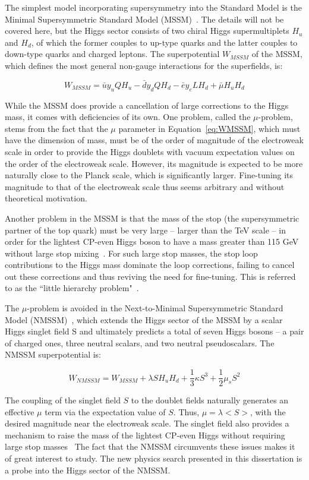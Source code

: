 The simplest model incorporating supersymmetry into the Standard Model is the Minimal Supersymmetric Standard Model (MSSM)~\cite{Martin:1997ns}. The details will not be covered here, but the Higgs sector consists of two chiral Higgs supermultiplets $H_u$ and $H_d$, of which the former couples to up-type quarks and the latter couples to down-type quarks and charged leptons. The superpotential $W_{MSSM}$ of the MSSM, which defines the most general non-gauge interactions for the superfields, is:

\begin{equation}
W_{MSSM} = \bar{u}y_{u}QH_{u} - \bar{d}y_{d}QH_{d} - \bar{e}y_{e}LH_{d} + \bar{\mu}H_{u}H_{d}
\label{eq:WMSSM}
\end{equation}

While the MSSM does provide a cancellation of large corrections to the Higgs mass, it comes with deficiencies of its own. One problem, called the $\mu$-problem, stems from the fact that the $\mu$ parameter in Equation~\ref{eq:WMSSM}, which must have the dimension of mass, must be of the order of magnitude of the electroweak scale in order to provide the Higgs doublets with vacuum expectation values on the order of the electroweak scale. However, its magnitude is expected to be more naturally close to the Planck scale, which is significantly larger. Fine-tuning its magnitude to that of the electroweak scale thus seems arbitrary and without theoretical motivation.

Another problem in the MSSM is that the mass of the stop (the supersymmetric partner of the top quark) must be very large -- larger than the TeV scale -- in order for the lightest CP-even Higgs boson to have a mass greater than 115 GeV without large stop mixing~\cite{Chatrchyan:2012am}. For such large stop masses, the stop loop contributions to the Higgs mass dominate the loop corrections, failing to cancel out these corrections and thus reviving the need for fine-tuning. This is referred to as the ``little hierarchy problem"~\cite{Bellazzini:2009ix}.

The $\mu$-problem is avoided in the Next-to-Minimal Supersymmetric Standard Model (NMSSM)~\cite{Maniatis:2009re}, which extends the Higgs sector of the MSSM by a scalar Higgs singlet field S and ultimately predicts a total of seven Higgs bosons -- a pair of charged ones, three neutral scalars, and two neutral pseudoscalars. The NMSSM superpotential is:

\begin{equation}
W_{NMSSM} = W_{MSSM} + \lambda SH_{u}H_{d} + \frac{1}{3}\kappa S^3 + \frac{1}{2}\mu_{s}S^2
\label{eq:WNMSSM}
\end{equation}

The coupling of the singlet field $S$ to the doublet fields naturally generates an effective $\mu$ term via the expectation value of $S$. Thus, $\mu = \lambda$$<S>$, with the desired magnitude near the electroweak scale. The singlet field also provides a mechanism to raise the mass of the lightest CP-even Higgs without requiring large stop masses~\cite{Chatrchyan:2012am,ref1,PhysRevD.39.844} The fact that the NMSSM circumvents these issues makes it of great interest to study. The new physics search presented in this dissertation is a probe into the Higgs sector of the NMSSM.